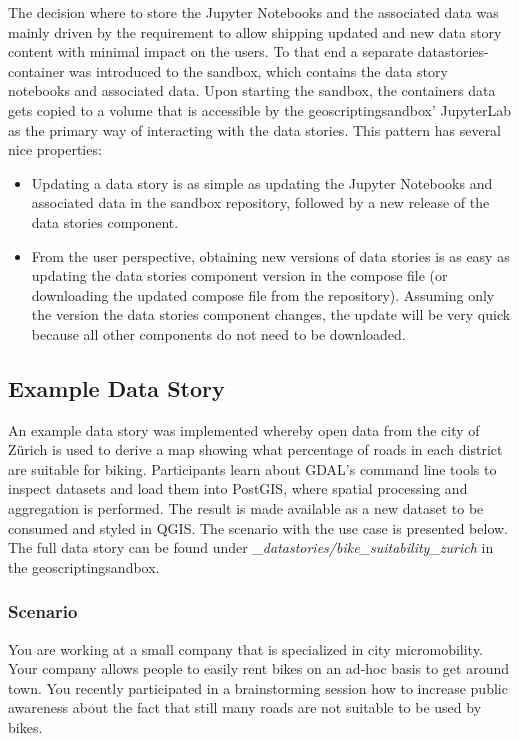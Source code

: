 \documentclass[11pt, a4paper, oneside, parskip=full-]{scrartcl}
\begin{document}
The decision where to store the Jupyter Notebooks and the associated data was
mainly driven by the requirement to allow shipping updated and new data story
content with minimal impact on the users. To that end a separate
datastories-container was introduced to the sandbox, which contains the data
story notebooks and associated data. Upon starting the sandbox, the containers
data gets copied to a volume that is accessible by the geoscriptingsandbox'
JupyterLab as the primary way of interacting with the data stories. This pattern
has several nice properties:
\begin{itemize}
  \item Updating a data story is as simple as updating the Jupyter Notebooks and
  associated data in the sandbox repository, followed by a new release of the
  data stories component.
  \item From the user perspective, obtaining new versions of data stories is as
  easy as updating the data stories component version in the compose file (or
  downloading the updated compose file from the repository). Assuming only the
  version the data stories component changes, the update will be very quick
  because all other components do not need to be downloaded.
\end{itemize}

\subsection{Example Data Story}
An example data story was implemented whereby open data from the city of Zürich
is used to derive a map showing what percentage of roads in each district are
suitable for biking. Participants learn about GDAL's command line tools to
inspect datasets and load them into PostGIS\cite{postgis}, where spatial
processing and aggregation is performed. The result is made available as a new
dataset to be consumed and styled in QGIS\cite{qgis}. The scenario with the use
case is presented below. The full data story can be found under
\emph{\_datastories/bike\_suitability\_zurich} in the geoscriptingsandbox.

\subsubsection*{Scenario}

You are working at a small company that is specialized in city micromobility.
Your company allows people to easily rent bikes on an ad-hoc basis to get around
town. You recently participated in a brainstorming session how to increase
public awareness about the fact that still many roads are not suitable to be
used by bikes.
\end{document}
